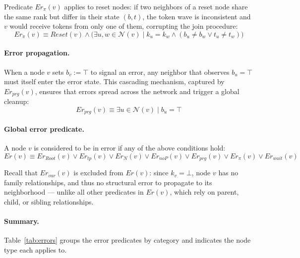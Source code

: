 \documentclass[a4paper, 12pt]{article}
\newcommand{\Neig}{\mathcal{N}}
\newcommand{\rk}{k}
\begin{document}
Predicate $Er_\pi(v)$ applies to reset nodes: if two neighbors of a reset node share
the same rank but differ in their state $(b, t)$, the token wave is inconsistent and
$v$ would receive tokens from only one of them, corrupting the join procedure:
\begin{equation}
    Er_\pi(v) \equiv \mathit{Reset}(v) \wedge
    \bigl(\exists u, w \in \Neig(v) \mid \rk_u = \rk_w
    \wedge (b_u \neq b_w \vee t_u \neq t_w)\bigr)
\end{equation}

\paragraph*{Error propagation.}

When a node $v$ sets $b_v := \top$ to signal an error, any neighbor that observes
$b_u = \top$ must itself enter the error state. This cascading mechanism, captured by
$Er_{prg}(v)$, ensures that errors spread across the network and trigger a global
cleanup:
\begin{equation}
    Er_{prg}(v) \equiv \exists u \in \Neig(v) \mid b_u = \top
    \label{eq:erprg}
\end{equation}

\paragraph*{Global error predicate.}

A node $v$ is considered to be in error if any of the above conditions hold:
\begin{equation}
    Er(v) \equiv Er_{Root}(v) \vee Er_{tp}(v) \vee Er_N(v) \vee Er_{noP}(v)
    \vee Er_{prg}(v) \vee Er_\pi(v) \vee Er_{wait}(v)
    \label{eq:er}
\end{equation}

Recall that $Er_{var}(v)$ is excluded from $Er(v)$: since $\rk_v = \bot$,
node $v$ has no family relationships, and thus no structural error to
propagate to its neighborhood — unlike all other predicates in $Er(v)$,
which rely on parent, child, or sibling relationships.

\paragraph*{Summary.}
Table~\ref{tab:errors} groups the error predicates by category and indicates the
node type each applies to.
\end{document}
